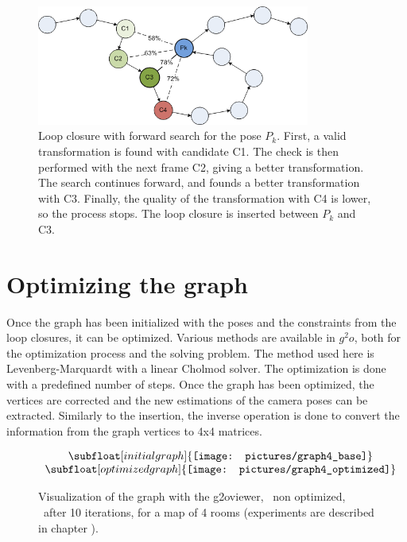 \begin{figure}[H]
\centering
 \includegraphics[width=0.8\textwidth]{figures/graph_lc_candidate}
\caption{Loop closure with forward search for the pose $P_k$. First, a valid transformation is found with candidate C1. The check is then performed with the next frame C2, giving a better transformation. The search continues forward, and founds a better transformation with C3. Finally, the quality of the transformation with C4 is lower, so the process stops. The loop closure is inserted between $P_k$ and C3.}
\label{fig:lc_candidate}
\end{figure}

\clearpage
\section{Optimizing the graph}

Once the graph has been initialized with the poses and the constraints from the loop closures, it can be optimized. Various methods are available in $g^2o$, both for the optimization process and the solving problem. The method used here is Levenberg-Marquardt with a linear Cholmod solver. The optimization is done with a predefined number of steps. Once the graph has been optimized, the vertices are corrected and the new estimations of the camera poses can be extracted. Similarly to the insertion, the inverse operation is done to convert the information from the graph vertices to 4x4 matrices.

\begin{figure}[H]
\centering$
 \begin{array}{c}
 \subfloat[initial graph]{\label{fig:g2o_view_1}\texttt{[image: pictures/graph4\_base]}} \\
 \subfloat[optimized graph]{\label{fig:g2o_view_2}\texttt{[image: pictures/graph4\_optimized]}}
 \end{array}$
\caption{Visualization of the graph with the g2oviewer, ~non optimized, ~after 10 iterations, for a map of 4 rooms (experiments are described in chapter \protect{\ref{chap:experiments}}).}
\end{figure}
\clearpage

